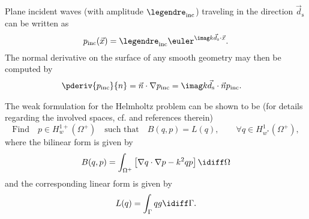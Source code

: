 Plane incident waves (with amplitude $\legendre_{\mathrm{inc}}$) traveling in the direction $\vec{d}_{\mathrm{s}}$ can be written as
\begin{equation}\label{Eq5:p_inc}
	p_{\mathrm{inc}}(\vec{x}) = \legendre_{\mathrm{inc}}\euler^{\imag k\vec{d}_{\mathrm{s}}\cdot\vec{x}}.
\end{equation}
The normal derivative on the surface of any smooth geometry may then be computed by
\begin{align}
	\pderiv{p_{\mathrm{inc}}}{n} &= \vec{n}\cdot\nabla p_{\mathrm{inc}} = \imag k\vec{d}_{\mathrm{s}}\cdot\vec{n} p_{\mathrm{inc}}.
\end{align}

The weak formulation for the Helmholtz problem can be shown to be (for details regarding the involved spaces, cf. \cite{Venas2018iao} and references therein)
\begin{equation}
	\text{Find} \quad p\in H_w^{1+}(\Omega^+)\quad\text{such that}\quad B(q,p) = L(q),\qquad \forall q\in H_{w^*}^1(\Omega^+),
\end{equation}
where the bilinear form is given by
\begin{equation}\label{Eq5:bilinear}
	B(q,p) = \int_{\Omega^+} \left[\nabla q\cdot\nabla p-  k^2qp\right]\idiff\Omega
\end{equation}
and the corresponding linear form is given by
\begin{equation*}
	L(q) = \int_{\Gamma} qg\idiff\Gamma.
\end{equation*}

